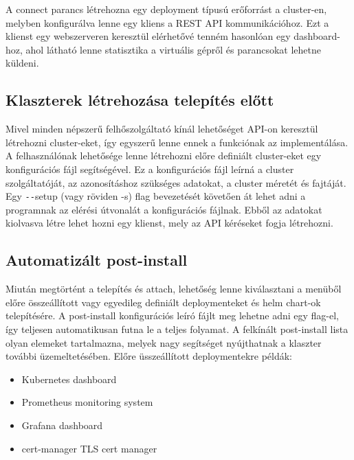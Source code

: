 A connect parancs létrehozna egy deployment típusú erőforrást a cluster-en, melyben konfigurálva lenne egy kliens a REST API kommunikációhoz.
Ezt a klienst egy webszerveren keresztül elérhetővé tenném hasonlóan egy dashboard-hoz, ahol látható lenne statisztika a virtuális gépről és parancsokat lehetne küldeni.

\subsection{Klaszterek létrehozása telepítés előtt}
Mivel minden népszerű felhőszolgáltató kínál lehetőséget API-on keresztül létrehozni cluster-eket, így egyszerű lenne ennek a funkciónak az implementálása.
A felhasználónak lehetősége lenne létrehozni előre definiált cluster-eket egy konfigurációs fájl segítségével.
Ez a konfigurációs fájl leírná a cluster szolgáltatóját, az azonosításhoz szükséges adatokat, a cluster méretét és fajtáját.
Egy \texttt{-{}-}setup (vagy röviden -s) flag bevezetését követően át lehet adni a programnak az elérési útvonalát a konfigurációs fájlnak.
Ebből az adatokat kiolvasva létre lehet hozni egy klienst, mely az API kéréseket fogja létrehozni.

\subsection{Automatizált post-install}
Miután megtörtént a telepítés és attach, lehetőség lenne kiválasztani a menüből előre összeállított vagy egyedileg definiált deploymenteket és helm chart-ok telepítésére.
A post-install konfigurációs leíró fájlt meg lehetne adni egy flag-el, így teljesen automatikusan futna le a teljes folyamat.
A felkínált post-install lista olyan elemeket tartalmazna, melyek nagy segítséget nyújthatnak a klaszter további üzemeltetésében.
Előre üsszeállított deploymentekre példák:
\begin{itemize}
    \item Kubernetes dashboard
    \item Prometheus monitoring system
    \item Grafana dashboard
    \item cert-manager TLS cert manager
\end{itemize}
